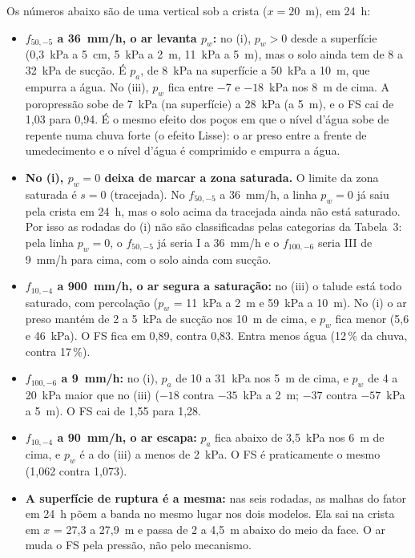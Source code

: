 \documentclass[11pt,a4paper]{article}
\begin{document}
Os números abaixo são de uma vertical sob a crista ($x = 20$~m), em 24~h:
\begin{itemize}
  \item \textbf{$f_{50,-5}$ a 36~mm/h, o ar levanta $p_w$:} no (i), $p_w > 0$ desde a superfície (0,3~kPa a 5~cm,
    5~kPa a 2~m, 11~kPa a 5~m), mas o solo ainda tem de 8 a 32~kPa de sucção. É $p_a$, de 8~kPa na superfície a
    50~kPa a 10~m, que empurra a água. No (iii), $p_w$ fica entre $-7$ e $-18$~kPa nos 8~m de cima. A poropressão sobe de
    7~kPa (na superfície) a 28~kPa (a 5~m), e o FS cai de 1,03 para 0,94. É o mesmo efeito dos poços em que o nível
    d'água sobe de repente numa chuva forte (o efeito Lisse): o ar preso entre a frente de umedecimento e o nível d'água
    é comprimido e empurra a água.
  \item \textbf{No (i), $p_w = 0$ deixa de marcar a zona saturada.} O limite da zona saturada é $s = 0$ (tracejada). No
    $f_{50,-5}$ a 36~mm/h, a linha $p_w = 0$ já saiu pela crista em 24~h, mas o solo acima da tracejada ainda não está
    saturado. Por isso as rodadas do (i) não são classificadas pelas categorias da Tabela~3: pela linha $p_w = 0$, o
    $f_{50,-5}$ já seria I a 36~mm/h e o $f_{100,-6}$ seria III de 9~mm/h para cima, com o solo ainda com sucção.
  \item \textbf{$f_{10,-4}$ a 900~mm/h, o ar segura a saturação:} no (iii) o talude está todo saturado, com percolação
    ($p_w$ = 11~kPa a 2~m e 59~kPa a 10~m). No (i) o ar preso mantém de 2 a 5~kPa de sucção nos 10~m de cima, e $p_w$
    fica menor (5,6 e 46~kPa). O FS fica em 0,89, contra 0,83. Entra menos água (12\,\% da chuva, contra 17\,\%).
  \item \textbf{$f_{100,-6}$ a 9~mm/h:} no (i), $p_a$ de 10 a 31~kPa nos 5~m de cima, e $p_w$ de 4 a 20~kPa maior que no
    (iii) ($-18$ contra $-35$~kPa a 2~m; $-37$ contra $-57$~kPa a 5~m). O FS cai de 1,55 para 1,28.
  \item \textbf{$f_{10,-4}$ a 90~mm/h, o ar escapa:} $p_a$ fica abaixo de 3,5~kPa nos 6~m de cima, e $p_w$ é a do (iii) a
    menos de 2~kPa. O FS é praticamente o mesmo (1,062 contra 1,073).
  \item \textbf{A superfície de ruptura é a mesma:} nas seis rodadas, as malhas do fator em 24~h põem a banda no mesmo
    lugar nos dois modelos. Ela sai na crista em $x$ = 27,3 a 27,9~m e passa de 2 a 4,5~m abaixo do meio da face. O ar
    muda o FS pela pressão, não pelo mecanismo.
\end{itemize}
\end{document}
